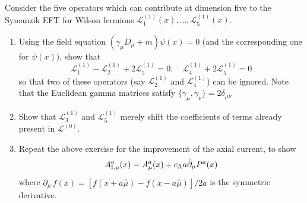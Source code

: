 Consider the five operators which can contribute at dimension five to the Symanzik EFT for Wilson fermions $\mathcal{L}_1^{(1)}(x), \dots, \mathcal{L}_5^{(1)}(x)$. 

\begin{enumerate}
	\item Using the field equation $(\gamma_{\mu}D_{\mu} + m)\psi(x) = 0$ (and the corresponding one for $\bar{\psi}(x)$), show that 
		\begin{equation}
			\mathcal{L}_1^{(1)} - \mathcal{L}_2^{(1)} + 2\mathcal{L}_5^{(1)} = 0, \quad \mathcal{L}_4^{(1)} + 2\mathcal{L}_5^{(1)} = 0 
		\end{equation}
        so that two of these operators (say $\mathcal{L}_2^{(1)}$ and $\mathcal{L}_4^{(1)}$) can be ignored. Note that the Euclidean gamma matrices satisfy $\{\gamma_{\mu},\gamma_{\nu}\} = 2\delta_{\mu\nu}$ 
	\item Show that $\mathcal{L}_{3}^{(1)}$ and $\mathcal{L}_5^{(1)}$ merely shift the coefficients of terms already present in $\mathcal{L}^{(0)}$.
	\item Repeat the above exercise for the improvement of the axial current, to show  
		\begin{equation} 
			A^{a}_{{\rm I},\mu}(x) = A^{a}_{\mu}(x) + c_{\rm A} a \hat{\partial}_{\mu}P^{a}(x)  
		\end{equation}
		where $\hat{\partial}_\mu \, f(x) = [f(x+a\hat{\mu}) - f(x - a\hat{\mu})]/2a$ is the symmetric derivative. 
\end{enumerate}